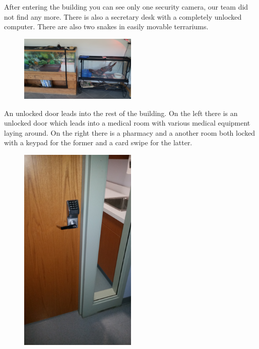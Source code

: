\documentclass[12pt]{article}
\begin{document}
        After entering the building you can see only one security camera, our team
        did not find any more. There is also a secretary desk with a completely 
        unlocked computer. There are also two snakes in easily movable terrariums.

        \begin{figure}
        \centering
        \includegraphics[width=0.5\textwidth, angle=270]{img/sneks.jpg}
        \end{figure}

        An unlocked door leads into the rest of the building. On the left there is 
        an unlocked door which leads into a medical room with various medical
        equipment laying around. On the right there is a pharmacy and a another room
        both locked with a keypad for the former and a card swipe for the latter.

        \begin{figure}
        \centering
        \includegraphics[width=0.5\textwidth, angle=270]{img/keypad.jpg}
        \end{figure}
\end{document}
